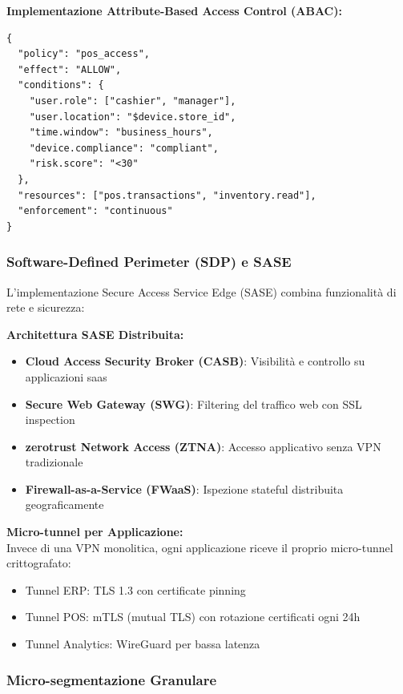\textbf{Implementazione Attribute-Based Access Control (ABAC):}
\begin{lstlisting}[caption={Policy ABAC per accesso POS},label={lst:abac_policy}]
{
  "policy": "pos_access",
  "effect": "ALLOW",
  "conditions": {
    "user.role": ["cashier", "manager"],
    "user.location": "$device.store_id",
    "time.window": "business_hours",
    "device.compliance": "compliant",
    "risk.score": "<30"
  },
  "resources": ["pos.transactions", "inventory.read"],
  "enforcement": "continuous"
}
\end{lstlisting}

\subsubsection{\texorpdfstring{\textbf{Software-Defined Perimeter (SDP) e SASE}}{3.5.1.2 - Software-Defined Perimeter (SDP) e SASE}}

L'implementazione Secure Access Service Edge (SASE) combina funzionalità di rete e sicurezza:

\textbf{Architettura SASE Distribuita:}
\begin{itemize}
    \item \textbf{Cloud Access Security Broker (CASB)}: Visibilità e controllo su applicazioni \gls{saas}
    \item \textbf{Secure Web Gateway (SWG)}: Filtering del traffico web con SSL inspection
    \item \textbf{\gls{zerotrust} Network Access (ZTNA)}: Accesso applicativo senza VPN tradizionale
    \item \textbf{Firewall-as-a-Service (FWaaS)}: Ispezione stateful distribuita geograficamente
\end{itemize}

\textbf{Micro-tunnel per Applicazione:}\\
Invece di una VPN monolitica, ogni applicazione riceve il proprio micro-tunnel crittografato:
\begin{itemize}
    \item Tunnel ERP: TLS 1.3 con certificate pinning
    \item Tunnel POS: mTLS (mutual TLS) con rotazione certificati ogni 24h
    \item Tunnel Analytics: WireGuard per bassa latenza
\end{itemize}

\subsubsection{\texorpdfstring{\textbf{Micro-segmentazione Granulare}}{3.5.1.3 - Micro-segmentazione Granulare}}


